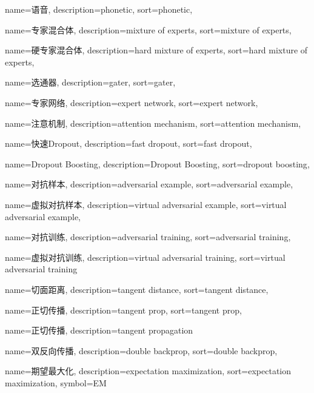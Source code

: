 {
  name=语音,
  description={phonetic},
  sort={phonetic},
}

{
  name=专家混合体,
  description={mixture of experts},
  sort={mixture of experts},
}

{
  name=硬专家混合体, %
  description={hard mixture of experts},
  sort={hard mixture of experts},
}

{
  name=选通器,
  description={gater},
  sort={gater},
}

{
  name=专家网络,
  description={expert network},
  sort={expert network},
}

{
  name=注意机制,
  description={attention mechanism},
  sort={attention mechanism},
}

{
  name=快速Dropout,
  description={fast dropout},
  sort={fast dropout},
}

{
  name=Dropout Boosting,
  description={Dropout Boosting},
  sort={dropout boosting},
}

{
  name=对抗样本,
  description={adversarial example},
  sort={adversarial example},
}

{
  name=虚拟对抗样本,
  description={virtual adversarial example},
  sort={virtual adversarial example},
}

{
  name=对抗训练,
  description={adversarial training},
  sort={adversarial training},
}

{
  name=虚拟对抗训练,
  description={virtual adversarial training},
  sort={virtual adversarial training}
}

{
  name=切面距离,
  description={tangent distance},
  sort={tangent distance},
}

{
  name=正切传播,
  description={tangent prop},
  sort={tangent prop},
}

{
  name=正切传播,
  description={tangent propagation}
}

{
  name=双反向传播,
  description={double backprop},
  sort={double backprop},
}

{
  name=期望最大化,
  description={expectation maximization},
  sort={expectation maximization},
  symbol={EM}
}

